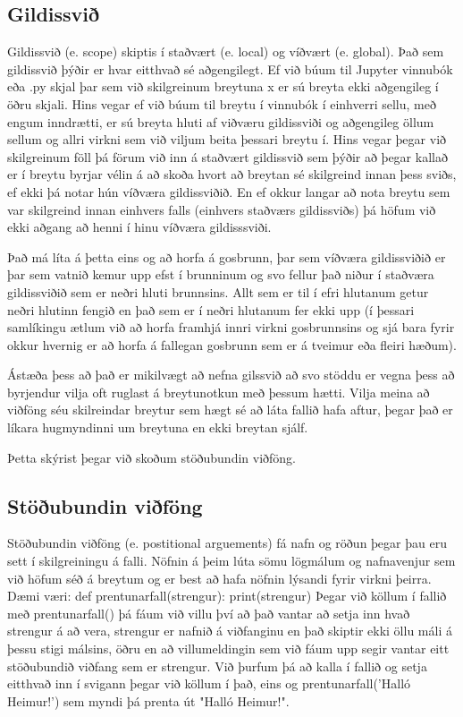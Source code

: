 \subsection{Gildissvið}
Gildissvið (e. scope) skiptis í staðvært (e. local) og víðvært (e. global). 
Það sem gildissvið þýðir er hvar eitthvað sé aðgengilegt.
Ef við búum til Jupyter vinnubók eða .py skjal þar sem við skilgreinum breytuna x er sú breyta ekki aðgengileg í öðru skjali.
Hins vegar ef við búum til breytu í vinnubók í einhverri sellu, með engum inndrætti, er sú breyta hluti af viðværu gildissviði og aðgengileg öllum sellum og allri virkni sem við viljum beita þessari breytu í.
Hins vegar þegar við skilgreinum föll þá förum við inn á staðvært gildissvið sem þýðir að þegar kallað er í breytu byrjar vélin á að skoða hvort að breytan sé skilgreind innan þess sviðs, ef ekki þá notar hún víðværa gildissviðið.
En ef okkur langar að nota breytu sem var skilgreind innan einhvers falls (einhvers staðværs gildissviðs) þá höfum við ekki aðgang að henni í hinu víðværa gildisssviði.

Það má líta á þetta eins og að horfa á gosbrunn, þar sem víðværa gildissviðið er þar sem vatnið kemur upp efst í brunninum og svo fellur það niður í staðværa gildissviðið sem er neðri hluti brunnsins.
Allt sem er til í efri hlutanum getur neðri hlutinn fengið en það sem er í neðri hlutanum fer ekki upp (í þessari samlíkingu ætlum við að horfa framhjá innri virkni gosbrunnsins og sjá bara fyrir okkur hvernig er að horfa á fallegan gosbrunn sem er á tveimur eða fleiri hæðum).

Ástæða þess að það er mikilvægt að nefna gilssvið að svo stöddu er vegna þess að byrjendur vilja oft ruglast á breytunotkun með þessum hætti.
Vilja meina að viðföng séu skilreindar breytur sem hægt sé að láta fallið hafa aftur, þegar það er líkara hugmyndinni um breytuna en ekki breytan sjálf.

Þetta skýrist þegar við skoðum stöðubundin viðföng.

\subsection{Stöðubundin viðföng}
Stöðubundin viðföng (e. postitional arguements) fá nafn og röðun þegar þau eru sett í skilgreiningu á falli.
Nöfnin á þeim lúta sömu lögmálum og nafnavenjur sem við höfum séð á breytum og er best að hafa nöfnin lýsandi fyrir virkni þeirra.
Dæmi væri:
\newline def prentunarfall(strengur): 
\newline \phantom{----}print(strengur)
\newline
Þegar við köllum í fallið með prentunarfall() þá fáum við villu því að það vantar að setja inn hvað strengur á að vera, strengur er nafnið á viðfanginu en það skiptir ekki öllu máli á þessu stigi málsins, öðru en að villumeldingin sem við fáum upp segir vantar eitt stöðubundið viðfang sem er strengur.
Við þurfum þá að kalla í fallið og setja eitthvað inn í svigann þegar við köllum í það, eins og prentunarfall('Halló Heimur!') sem myndi þá prenta út "Halló Heimur!".

